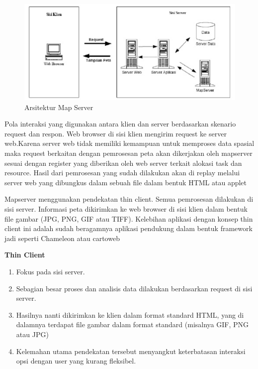 \begin{figure}[ht]
\centering
\includegraphics[width=1\textwidth]{pictures/arsitektur_map_server}
\caption{Arsitektur Map Server}
\label{arsitektur_map_server}
\end{figure}

Pola interaksi yang digunakan antara klien dan server berdasarkan skenario request dan respon. Web browser di sisi klien mengirim request ke server web.Karena server web tidak memiliki kemampuan untuk memproses data spasial maka request berkaitan dengan pemrosesan peta akan dikerjakan oleh mapserver sesuai dengan register yang diberikan oleh web server terkait alokasi task dan resource.
Hasil dari pemrosesan yang sudah dilakukan akan di replay melalui server web yang dibungkus dalam sebuah file dalam bentuk HTML atau applet

Mapserver menggunakan pendekatan thin client.
Semua pemrosesan dilakukan di sisi server. Informasi peta dikirimkan ke web browser di sisi klien dalam bentuk file gambar (JPG, PNG, GIF atau TIFF). Kelebihan aplikasi dengan konsep thin client ini adalah sudah beragamnya aplikasi pendukung dalam bentuk framework jadi seperti Chameleon atau cartoweb \cite{walter2018web}


\subitem \textbf{Thin Client}
\begin{enumerate}
\item Fokus pada sisi server.
\item Sebagian besar proses dan analisis data dilakukan berdasarkan request di sisi server.
\item Hasilnya nanti dikirimkan ke klien dalam format standard HTML, yang di dalamnya terdapat file gambar dalam format standard (misalnya GIF, PNG atau JPG)
\item Kelemahan utama pendekatan tersebut menyangkut keterbatasan interaksi opsi dengan user yang kurang fleksibel.
\end{enumerate}

